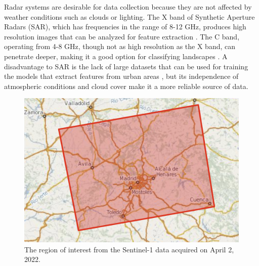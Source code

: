 \documentclass[conference]{IEEEtran}
\begin{document}
		Radar systems are desirable for data collection because they are not affected by weather conditions such as clouds or lighting.
		The X band of Synthetic Aperture Radars (SAR), which has frequencies in the range of 8-12 GHz, produces high resolution images that can be analyzed for feature extraction \cite{Wurm_2017}.
		The C band, operating from 4-8 GHz, though not as high resolution as the X band, can penetrate deeper, making it a good option for classifying landscapes \cite{Hu_2018}. 
		A disadvantage to SAR is the lack of large datasets that can be used for training the models that extract features from urban areas \cite{Shi_Wenzhong_2020}, but its independence of atmospheric conditions and cloud cover make it a more reliable source of data. 

		\begin{figure}[htbp]
			\centerline{\includegraphics[scale=0.25]{Images/Madrid_SLC_IW_Data.PNG}}
			\caption{The region of interest from the Sentinel-1 data acquired on April 2, 2022.}
			\label{img:Madrid_SLC_IW_Data}
		\end{figure}
	
\end{document}

